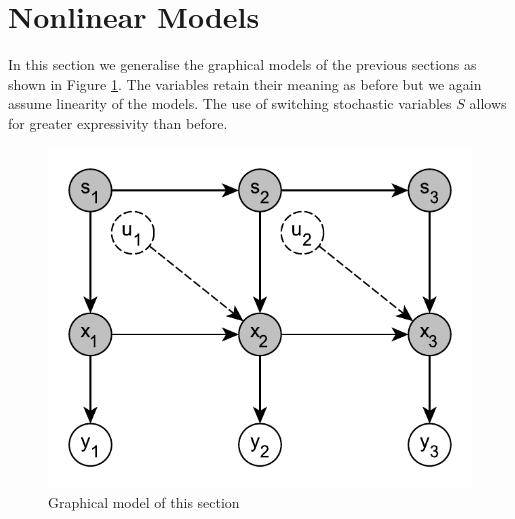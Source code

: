\documentclass[../masters.tex]{subfiles}
\begin{document}
\graphicspath{{./imgs/}{../imgs/}} %

\section{Nonlinear Models}
In this section we generalise the graphical models of the previous sections as shown in Figure \ref{fig_hybridmod}. The variables retain their meaning as before but we again assume linearity of the models. The
use of switching stochastic variables $S$ allows for greater expressivity than before.     
\begin{figure}[H] 
\centering
\includegraphics[scale=1.0]{hybrid_model.pdf}
\caption{Graphical model of this section}
\label{fig_hybridmod}
\end{figure}


%
%
\end{document}
